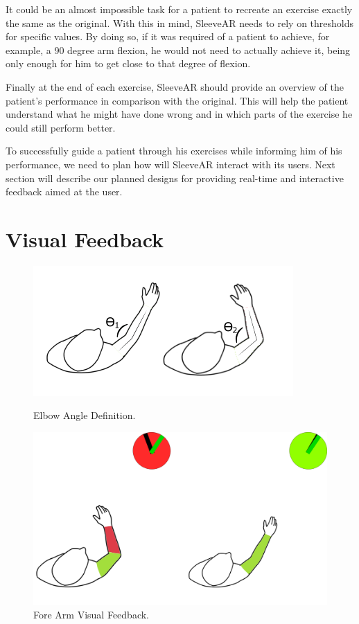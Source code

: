 It could be an almost impossible task for a patient to recreate an exercise exactly the same as the original. 
With this in mind, SleeveAR needs to rely on thresholds for specific values. 
By doing so, if it was required of a patient to achieve, for example, a 90 degree arm flexion, he would not 
need to actually achieve it, being only enough for him to get close to that degree of flexion.

Finally at the end of each exercise, SleeveAR should provide an overview of the patient's performance in comparison with the original. 
This will help the patient understand what he might have done wrong and in which parts of the exercise he could still perform better.

To successfully guide a patient through his exercises while informing him of his performance, we need to plan how will SleeveAR interact with its users. 
Next section will describe our planned designs for providing real-time and interactive feedback aimed at the user.

\section{Visual Feedback}
\label{vision-feedback}


\begin{figure}[!t]
  \centering
  \includegraphics[width=0.7\linewidth]{imgs/elbowangle.png}
    \caption{Elbow Angle Definition.}
    \label{fig:elbowangle}
    \endminipage\hfill
{}
  \centering
  \includegraphics[width=0.9\linewidth]{imgs/forearmfeedback.png}
    \caption{Fore Arm Visual Feedback.}
    \label{fig:forearmfeedback}
    \endminipage
\end{figure}



